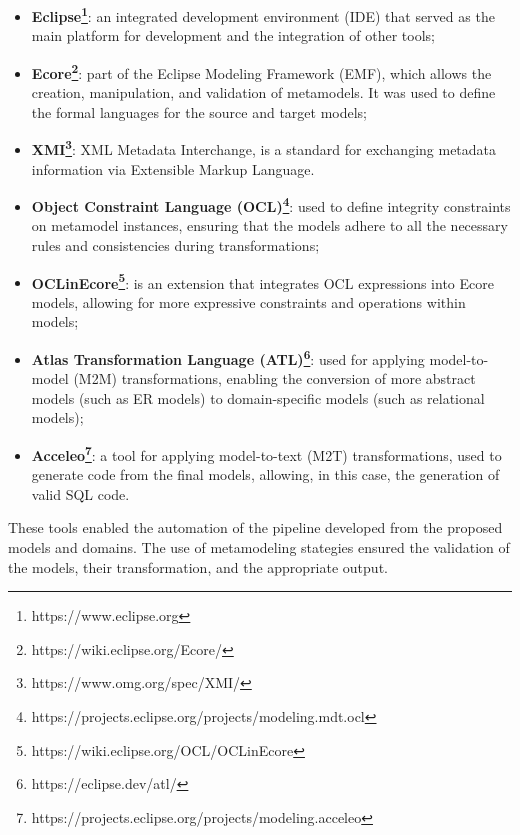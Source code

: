 \documentclass[10pt]{article}
\begin{document}
\begin{itemize}

    \item \textbf{Eclipse\footnote{https://www.eclipse.org}}: an integrated development environment (IDE) that served as the main platform for development and the integration of other tools;
    
    \item \textbf{Ecore\footnote{https://wiki.eclipse.org/Ecore/}}: part of the Eclipse Modeling Framework (EMF), which allows the creation, manipulation, and validation of metamodels. It was used to define the formal languages for the source and target models;

    \item \textbf{XMI\footnote{https://www.omg.org/spec/XMI/}}: XML Metadata Interchange, is a standard for exchanging metadata information via Extensible Markup Language.

    \item \textbf{Object Constraint Language (OCL)\footnote{https://projects.eclipse.org/projects/modeling.mdt.ocl}}: used to define integrity constraints on metamodel instances, ensuring that the models adhere to all the necessary rules and consistencies during transformations;
    
    \item \textbf{OCLinEcore\footnote{https://wiki.eclipse.org/OCL/OCLinEcore}}: is an extension that integrates OCL expressions into Ecore models, allowing for more expressive constraints and operations within models;
    
    \item \textbf{Atlas Transformation Language (ATL)\footnote{https://eclipse.dev/atl/}}: used for applying model-to-model (M2M) transformations, enabling the conversion of more abstract models (such as ER models) to domain-specific models (such as relational models);
    
    \item \textbf{Acceleo\footnote{https://projects.eclipse.org/projects/modeling.acceleo}}: a tool for applying model-to-text (M2T) transformations, used to generate code from the final models, allowing, in this case, the generation of valid SQL code.
    
\end{itemize}

These tools enabled the automation of the pipeline developed from the proposed models and domains. The use of metamodeling stategies ensured the validation of the models, their transformation, and the appropriate output.
\end{document}
